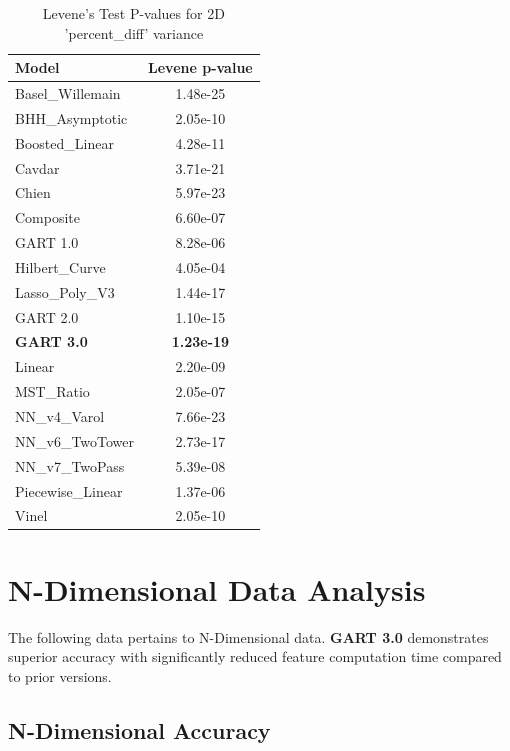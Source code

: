 \documentclass[11pt, a4paper]{article}
\begin{document}
\begin{table}[H]
    \centering
    \caption{Levene's Test P-values for 2D 'percent\_diff' variance}
    \label{tab:levene}
    \begin{tabular}{lS[table-format=1.2e-2]}
        \toprule
        \textbf{Model} & {\textbf{Levene p-value}} \\
        \midrule
        Basel\_Willemain & 1.48e-25 \\
        BHH\_Asymptotic & 2.05e-10 \\
        Boosted\_Linear & 4.28e-11 \\
        Cavdar & 3.71e-21 \\
        Chien & 5.97e-23 \\
        Composite & 6.60e-07 \\
        GART 1.0 & 8.28e-06 \\
        Hilbert\_Curve & 4.05e-04 \\
        Lasso\_Poly\_V3 & 1.44e-17 \\
        GART 2.0 & 1.10e-15 \\
        \textbf{GART 3.0} & \textbf{1.23e-19} \\
        Linear & 2.20e-09 \\
        MST\_Ratio & 2.05e-07 \\
        NN\_v4\_Varol & 7.66e-23 \\
        NN\_v6\_TwoTower & 2.73e-17 \\
        NN\_v7\_TwoPass & 5.39e-08 \\
        Piecewise\_Linear & 1.37e-06 \\
        Vinel & 2.05e-10 \\
        \bottomrule
    \end{tabular}
\end{table}

\clearpage
\section{N-Dimensional Data Analysis}

The following data pertains to N-Dimensional data. \textbf{GART 3.0} demonstrates superior accuracy with significantly reduced feature computation time compared to prior versions.

\subsection{N-Dimensional Accuracy}
\end{document}
